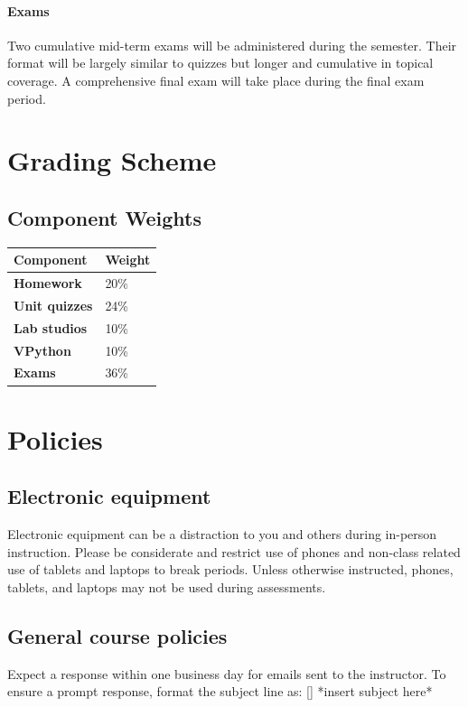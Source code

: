 \documentclass{syllabus}
\begin{document}
\paragraph{Exams} Two cumulative mid-term exams will be administered during the semester. Their format will be largely similar to quizzes but longer and cumulative in topical coverage. A comprehensive final exam will take place during the final exam period.

\section*{Grading Scheme}
\subsection*{Component Weights}

\noindent\begin{tabular}{ll}
\textbf{Component} & \textbf{Weight}       \\ \hline
\textbf{Homework}               & 20\%  \\
\textbf{Unit quizzes}           & 24\%  \\
\textbf{Lab studios}            & 10\%  \\
\textbf{VPython}                & 10\%  \\
\textbf{Exams}                  & 36\%
\end{tabular}%


\section*{Policies}
\subsection{Electronic equipment}
Electronic equipment can be a distraction to you and others during in-person instruction. Please be considerate and restrict use of phones and non-class related use of tablets and laptops to break periods. Unless otherwise instructed, phones, tablets, and laptops may not be used during assessments.

\subsection{General course policies}
Expect a response within one business day for emails sent to the instructor. To ensure a prompt response, format the subject line as: [\coursecode] *insert subject here*
\end{document}

